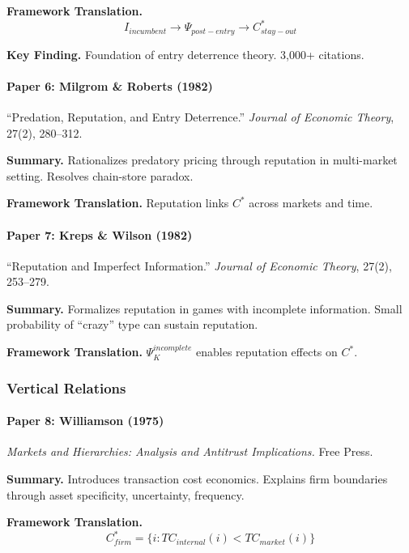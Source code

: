 \textbf{Framework Translation.}
\begin{equation}
I_{incumbent} \to \Psi_{post-entry} \to C^*_{stay-out}
\end{equation}

\textbf{Key Finding.}
Foundation of entry deterrence theory. 3,000+ citations.

\paragraph{Paper 6: Milgrom \& Roberts (1982)}

``Predation, Reputation, and Entry Deterrence.''
\textit{Journal of Economic Theory}, 27(2), 280--312.

\textbf{Summary.}
Rationalizes predatory pricing through reputation in multi-market setting.
Resolves chain-store paradox.

\textbf{Framework Translation.}
Reputation links $C^*$ across markets and time.

\paragraph{Paper 7: Kreps \& Wilson (1982)}

``Reputation and Imperfect Information.''
\textit{Journal of Economic Theory}, 27(2), 253--279.

\textbf{Summary.}
Formalizes reputation in games with incomplete information. Small probability 
of ``crazy'' type can sustain reputation.

\textbf{Framework Translation.}
$\Psi_K^{incomplete}$ enables reputation effects on $C^*$.

\subsubsection{Vertical Relations}

\paragraph{Paper 8: Williamson (1975)}

\textit{Markets and Hierarchies: Analysis and Antitrust Implications.}
Free Press.

\textbf{Summary.}
Introduces transaction cost economics. Explains firm boundaries through 
asset specificity, uncertainty, frequency.

\textbf{Framework Translation.}
\begin{equation}
C^*_{firm} = \{i : TC_{internal}(i) < TC_{market}(i)\}
\end{equation}

